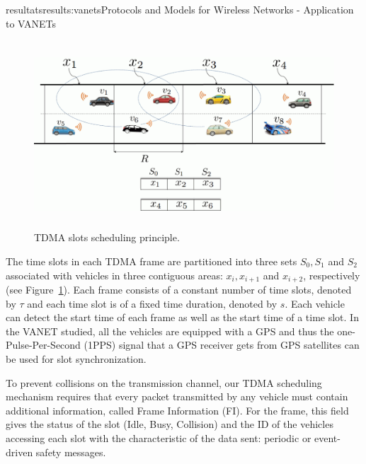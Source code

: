 \documentclass{ra2016}
\begin{document}
\begin{module}{resultats}{results:vanets}{Protocols and Models for Wireless Networks - Application to VANETs}
\begin{figure}[!htbp]
  \begin{center}
  \includegraphics[height=7cm,width=14cm]{IMG/DTMAC_idea.pdf}
  \end{center}
  \caption{TDMA slots scheduling principle.}
 \label{figc:DTMAC_idea}
\end{figure}

The time slots in each TDMA frame are partitioned into three sets $S_0, S_1$ and $S_2$ associated with vehicles in three 
contiguous areas: $x_i, x_{i+1}$ and $x_{i+2}$, respectively (see Figure~\ref{figc:DTMAC_idea}). Each frame consists of a 
constant number of time slots, denoted by $\tau$ and each time slot is of a fixed time duration, denoted by $s$. Each vehicle 
can detect the start time of each frame as well as the start time of a time slot. In the VANET studied, all the vehicles are 
equipped with a GPS and thus the one-Pulse-Per-Second (1PPS) signal that a GPS receiver gets from GPS 
satellites can be used for slot synchronization. 

To prevent collisions on the transmission channel, our TDMA scheduling mechanism requires that every packet transmitted by 
any vehicle must contain additional information, called Frame Information (FI).
For the frame, this field gives the status of the slot (Idle, Busy, Collision) and 
the ID of the vehicles accessing each slot with the characteristic of the data 
sent: periodic or event-driven safety messages.
 

\end{module}
\end{document}
